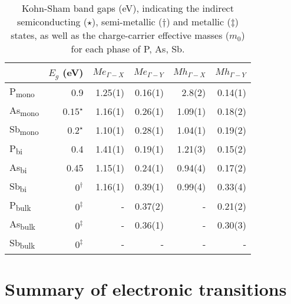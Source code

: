 \begin{table}[htb!]
\centering
\begin{tabular}{lrrrrr}
\hline\hline
&$E_g$ (eV) &$Me_{\Gamma-X}$&$Me_{\Gamma-Y}$&$Mh_{\Gamma-X}$&$Mh_{\Gamma-Y}$\\
\hline
P\textsubscript{mono}	&0.9			&1.25(1)&0.16(1)&2.8(2)&0.14(1)\\
As\textsubscript{mono}	&$0.15^\star$	&1.16(1)&0.26(1)&1.09(1)&0.18(2)\\
Sb\textsubscript{mono}	&$0.2^\star$	&1.10(1)&0.28(1)&1.04(1)&0.19(2)\\
\hline
P\textsubscript{bi}		&0.4			&1.41(1)&0.19(1)&1.21(3)&0.15(2)\\
As\textsubscript{bi}		&0.45		&1.15(1)&0.24(1)&0.94(4)&0.17(2)\\
Sb\textsubscript{bi}		&$0^\dagger$	&1.16(1)&0.39(1)&0.99(4)&0.33(4)\\
\hline
P\textsubscript{bulk}		&$0^\ddagger$	&-&0.37(2)&-&0.21(2)\\
As\textsubscript{bulk}	&$0^\ddagger$	&-&0.36(1)&-&0.30(3)\\
Sb\textsubscript{bulk}	&$0^\ddagger$	&-&-&-&-\\
\hline\hline
\end{tabular}
\caption{ 
Kohn-Sham band gaps (eV), 
indicating the indirect semiconducting ($\star$), 
semi-metallic ($\dagger$) 
and metallic ($\ddagger$) states, 
as well as the charge-carrier 
effective masses ($m_0$) 
for each phase of P, As, Sb.
}
\label{table:bandgaps}
\end{table}

\clearpage
\section{Summary of electronic transitions}
\label{sec:elec_transitions}

